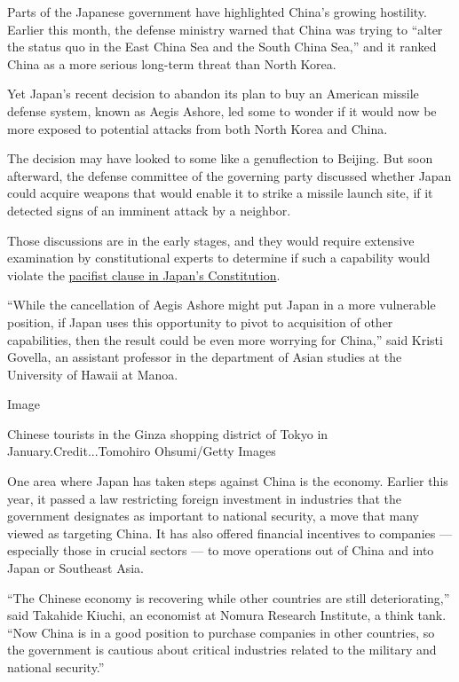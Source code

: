 Parts of the Japanese government have highlighted China's growing
hostility. Earlier this month, the defense ministry warned that China
was trying to ``alter the status quo in the East China Sea and the South
China Sea,'' and it ranked China as a more serious long-term threat than
North Korea.

Yet Japan's recent decision to abandon its plan to buy an American
missile defense system, known as Aegis Ashore, led some to wonder if it
would now be more exposed to potential attacks from both North Korea and
China.

The decision may have looked to some like a genuflection to Beijing. But
soon afterward, the defense committee of the governing party discussed
whether Japan could acquire weapons that would enable it to strike a
missile launch site, if it detected signs of an imminent attack by a
neighbor.

Those discussions are in the early stages, and they would require
extensive examination by constitutional experts to determine if such a
capability would violate the
\href{https://www.nytimes3xbfgragh.onion/2017/05/03/world/asia/japan-constitution-shinzo-abe-military.html?searchResultPosition=1}{pacifist
clause in Japan's Constitution}.

``While the cancellation of Aegis Ashore might put Japan in a more
vulnerable position, if Japan uses this opportunity to pivot to
acquisition of other capabilities, then the result could be even more
worrying for China,'' said Kristi Govella, an assistant professor in the
department of Asian studies at the University of Hawaii at Manoa.

Image

Chinese tourists in the Ginza shopping district of Tokyo in
January.Credit...Tomohiro Ohsumi/Getty Images

One area where Japan has taken steps against China is the economy.
Earlier this year, it passed a law restricting foreign investment in
industries that the government designates as important to national
security, a move that many viewed as targeting China. It has also
offered financial incentives to companies --- especially those in
crucial sectors --- to move operations out of China and into Japan or
Southeast Asia.

``The Chinese economy is recovering while other countries are still
deteriorating,'' said Takahide Kiuchi, an economist at Nomura Research
Institute, a think tank. ``Now China is in a good position to purchase
companies in other countries, so the government is cautious about
critical industries related to the military and national security.''

